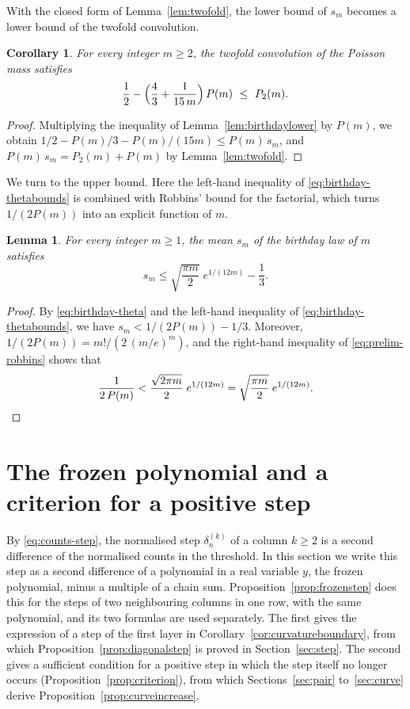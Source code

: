 \documentclass{amsart}
\newtheorem{lemma}[theorem]{Lemma}
\newtheorem{corollary}[theorem]{Corollary}
\theoremstyle{definition}
\theoremstyle{remark}
\numberwithin{equation}{section}
\begin{document}
With the closed form of Lemma~\ref{lem:twofold}, the lower bound of $s_m$
becomes a lower bound of the twofold convolution.

\begin{corollary}\label{cor:twofoldlower}
For every integer $m\ge2$, the twofold convolution of the Poisson mass
satisfies
\[
\frac12-\Bigl(\frac43+\frac{1}{15\,m}\Bigr)\,P(m)\ \le\ P_2(m).
\]
\end{corollary}

\begin{proof}
Multiplying the inequality of Lemma~\ref{lem:birthdaylower} by $P(m)$, we
obtain $1/2-P(m)/3-P(m)/(15m)\le P(m)\,s_m$, and
$P(m)\,s_m=P_2(m)+P(m)$ by Lemma~\ref{lem:twofold}.
\end{proof}

We turn to the upper bound. Here the left-hand inequality of
\eqref{eq:birthday-thetabounds} is combined with Robbins' bound for the
factorial, which turns $1/(2P(m))$ into an explicit function of $m$.

\begin{lemma}\label{lem:birthdayupper}
For every integer $m\ge1$, the mean $s_m$ of the birthday law of $m$
satisfies
\[
s_m\le\sqrt{\frac{\pi m}{2}}\;e^{1/(12m)}-\frac13.
\]
\end{lemma}

\begin{proof}
By \eqref{eq:birthday-theta} and the left-hand inequality of
\eqref{eq:birthday-thetabounds}, we have $s_m<1/(2P(m))-1/3$. Moreover,
$1/(2P(m))=m!/(2\,(m/e)^{m})$, and the right-hand inequality of
\eqref{eq:prelim-robbins} shows
that
\[
\frac{1}{2\,P(m)}<\frac{\sqrt{2\pi m}}{2}\;e^{1/(12m)}
=\sqrt{\frac{\pi m}{2}}\;e^{1/(12m)}.\qedhere
\]
\end{proof}

\section{The frozen polynomial and a criterion for a positive step}\label{sec:frozen}
By \eqref{eq:counts-step}, the normalised step $\delta^{(k)}_n$ of a column
$k\ge2$ is a second difference of the normalised counts in the threshold.
In this section we write this step as a second difference of a polynomial
in a real variable $y$, the frozen polynomial, minus a multiple of a chain
sum. Proposition~\ref{prop:frozenstep} does this for the steps of two
neighbouring columns in one row, with the same polynomial, and its two
formulas are used
separately. The first gives the expression of a step of the first layer in
Corollary~\ref{cor:curvatureboundary}, from which
Proposition~\ref{prop:diagonalstep} is proved in Section~\ref{sec:step}.
The second gives a sufficient condition for a positive step in which the
step itself no longer occurs (Proposition~\ref{prop:criterion}), from which
Sections~\ref{sec:pair} to~\ref{sec:curve} derive
Proposition~\ref{prop:curveincrease}.
\end{document}

